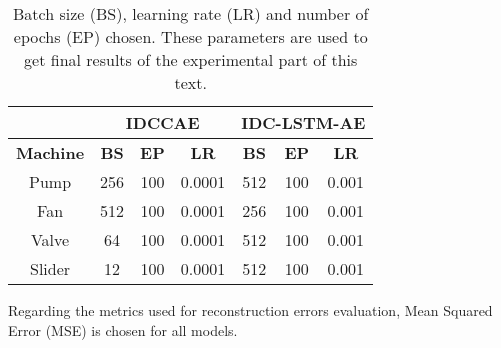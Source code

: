 \begin{table}[ht]
\centering
\begin{tabular}{|c|c|c|c|c|c|c|} 
\cline{2-7}
\multicolumn{1}{c|}{} & \multicolumn{3}{c|}{\textbf{IDCCAE}} & \multicolumn{3}{c|}{\textbf{IDC-LSTM-AE}} \\
\hline
\textbf{Machine} & \textbf{BS} & \textbf{EP} & \textbf{LR} & \textbf{BS} & \textbf{EP} & \textbf{LR} \\ 
\hline
Pump & 256	& 100 & 0.0001 & 512 & 100 & 0.001  \\ 
\hline
Fan & 512 & 100 & 0.0001 & 256 & 100 & 0.001  \\ 
\hline
Valve & 64 & 100 & 0.0001 &	512 & 100 & 0.001  \\ 
\hline
Slider & 12	& 100 & 0.0001 & 512 & 100 & 0.001  \\
\hline
\end{tabular}
\caption{Batch size (BS), learning rate (LR) and number of epochs (EP) chosen. These parameters are used to get final results of the experimental part of this text.}
\label{hyperparam-tables}
\end{table}
Regarding the metrics used for reconstruction errors evaluation, Mean Squared Error (MSE) is chosen for all models.

